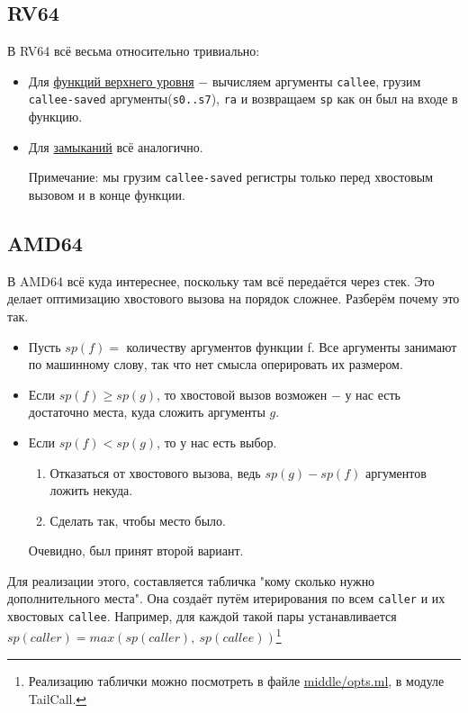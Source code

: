 \subsection{RV64}

В RV64 всё весьма относительно тривиально:
\begin{itemize}
	\item Для \href{https://github.com/KrimPast/rukaml/blob/7d05249ecd7c3cf5490ba5d807674cd9fc18ba7b/back/rv64/RV64_impl.ml#L1054-L1063}{функций верхнего уровня} $-$ вычисляем аргументы \texttt{callee}, грузим \texttt{callee-saved} аргументы(\texttt{s0..s7}), \texttt{ra} и возвращаем \texttt{sp} как он был на входе в функцию.
	\item Для \href{https://github.com/KrimPast/rukaml/blob/7d05249ecd7c3cf5490ba5d807674cd9fc18ba7b/back/rv64/RV64_impl.ml#L1099-L1104}{замыканий} всё аналогично.
	
Примечание: мы грузим \texttt{callee-saved} регистры только перед хвостовым вызовом и в конце функции.
\end{itemize} 

\subsection{AMD64}
\label{subsec:AMD64_ASM}

В AMD64 всё куда интереснее, поскольку там всё передаётся через стек.
Это делает оптимизацию хвостового вызова на порядок сложнее. Разберём почему это так.

\begin{itemize}
	\item Пусть $ sp(f) = $ количеству аргументов функции f. Все аргументы занимают по машинному слову, так что нет смысла оперировать их размером.
	\item Если $sp(f) \geq sp(g)$, то хвостовой вызов возможен $-$ у нас есть достаточно места, куда сложить аргументы $g$.
	\item Если $sp(f) < sp(g)$, то у нас есть выбор.
	\begin{enumerate}
		\item Отказаться от хвостового вызова, ведь $sp(g) - sp(f)$ аргументов ложить некуда.
		\item Сделать так, чтобы место было.
	\end{enumerate}
	
	Очевидно, был принят второй вариант. 
\end{itemize}

Для реализации этого, составляется табличка "кому сколько нужно дополнительного места".
Она создаёт путём итерирования по всем \texttt{caller} и их хвостовых \texttt{callee}.
Например, для каждой такой пары устанавливается $sp(caller) = max(sp(caller),\ sp(callee))$\footnote{Реализацию таблички можно посмотреть в файле \href{https://github.com/KrimPast/rukaml/blob/7d05249ecd7c3cf5490ba5d807674cd9fc18ba7b/middle/opts.ml}{middle/opts.ml}, в модуле TailCall.}

